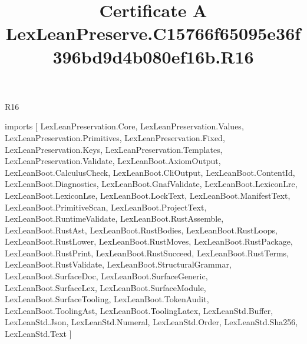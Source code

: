 \begin{lexlean}{R16}
\title{Certificate A LexLeanPreserve.C15766f65095e36f396bd9d4b080ef16b.R16}
\begin{coremodule}
imports [
  LexLeanPreservation.Core,
  LexLeanPreservation.Values,
  LexLeanPreservation.Primitives,
  LexLeanPreservation.Fixed,
  LexLeanPreservation.Keys,
  LexLeanPreservation.Templates,
  LexLeanPreservation.Validate,
  LexLeanBoot.AxiomOutput,
  LexLeanBoot.CalculusCheck,
  LexLeanBoot.CliOutput,
  LexLeanBoot.ContentId,
  LexLeanBoot.Diagnostics,
  LexLeanBoot.GnafValidate,
  LexLeanBoot.LexiconLre,
  LexLeanBoot.LexiconLse,
  LexLeanBoot.LockText,
  LexLeanBoot.ManifestText,
  LexLeanBoot.PrimitiveScan,
  LexLeanBoot.ProjectText,
  LexLeanBoot.RuntimeValidate,
  LexLeanBoot.RustAssemble,
  LexLeanBoot.RustAst,
  LexLeanBoot.RustBodies,
  LexLeanBoot.RustLoops,
  LexLeanBoot.RustLower,
  LexLeanBoot.RustMoves,
  LexLeanBoot.RustPackage,
  LexLeanBoot.RustPrint,
  LexLeanBoot.RustSucceed,
  LexLeanBoot.RustTerms,
  LexLeanBoot.RustValidate,
  LexLeanBoot.StructuralGrammar,
  LexLeanBoot.SurfaceDoc,
  LexLeanBoot.SurfaceGeneric,
  LexLeanBoot.SurfaceLex,
  LexLeanBoot.SurfaceModule,
  LexLeanBoot.SurfaceTooling,
  LexLeanBoot.TokenAudit,
  LexLeanBoot.ToolingAst,
  LexLeanBoot.ToolingLatex,
  LexLeanStd.Buffer,
  LexLeanStd.Json,
  LexLeanStd.Numeral,
  LexLeanStd.Order,
  LexLeanStd.Sha256,
  LexLeanStd.Text
]


\end{coremodule}
\end{lexlean}
